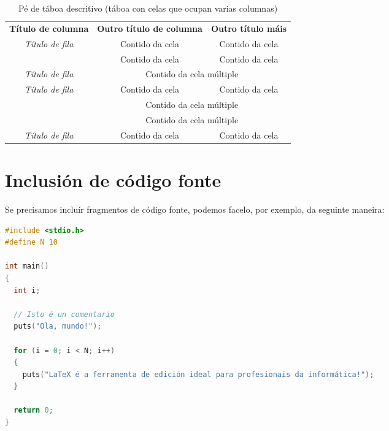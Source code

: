 \begin{table}[hp!]
  \centering
  \begin{tabular}{c|c|c}
  \rowcolor{udcpink!25}
  \multicolumn{3}{c}{\textbf{Cela en varias columnas}} \\\hline
  \rowcolor{udcpink!25}
  \textbf{Título de columna}               & \textbf{Outro título de columna}             & \textbf{Outro título máis} \\\hline
  \multirow{2}{*}{\textit{Título de fila}} & \cellcolor{udcgray!25} Contido da cela       & \cellcolor{udcgray!25} Contido da cela \\
                                           & Contido da cela                              & Contido da cela \\
  \rowcolor{udcgray!25}
  \textit{Título de fila}                  & \multicolumn{2}{c}{Contido da cela múltiple} \\
  \multirow{3}{*}{\textit{Título de fila}} & Contido da cela                              & Contido da cela \\
                                           & \multicolumn{2}{c}{\cellcolor{udcgray!25} Contido da cela múltiple} \\
                                           & \multicolumn{2}{c}{Contido da cela múltiple} \\
  \rowcolor{udcgray!25}
  \textit{Título de fila}                  & Contido da cela                              & Contido da cela \\
  \end{tabular}
  \caption{Pé de táboa descritivo (táboa con celas que ocupan varias columnas)}
  \label{tab:exemplofilasecolumnas}
\end{table}

\section{Inclusión de código fonte}

Se precisamos incluír fragmentos de código fonte, podemos facelo, por exemplo, da
seguinte maneira:

\begin{lstlisting}[language=C]
#include <stdio.h>
#define N 10

int main()
{
  int i;

  // Isto é un comentario
  puts("Ola, mundo!");

  for (i = 0; i < N; i++)
  {
    puts("LaTeX é a ferramenta de edición ideal para profesionais da informática!");
  }

  return 0;
}
\end{lstlisting}

